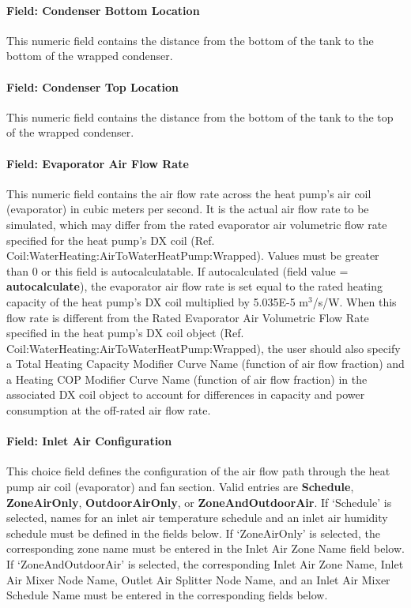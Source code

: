 \paragraph{Field: Condenser Bottom Location}\label{field-condenser-bottom-location}

This numeric field contains the distance from the bottom of the tank to the bottom of the wrapped condenser.

\paragraph{Field: Condenser Top Location}\label{field-condenser-top-location}

This numeric field contains the distance from the bottom of the tank to the top of the wrapped condenser.

\paragraph{Field: Evaporator Air Flow Rate}\label{field-evaporator-air-flow-rate-1}

This numeric field contains the air flow rate across the heat pump's air coil (evaporator) in cubic meters per second. It is the actual air flow rate to be simulated, which may differ from the rated evaporator air volumetric flow rate specified for the heat pump's DX coil (Ref. Coil:WaterHeating:AirToWaterHeatPump:Wrapped). Values must be greater than 0 or this field is autocalculatable. If autocalculated (field value = \textbf{autocalculate}), the evaporator air flow rate is set equal to the rated heating capacity of the heat pump's DX coil multiplied by 5.035E-5 m\(^{3}\)/s/W. When this flow rate is different from the Rated Evaporator Air Volumetric Flow Rate specified in the heat pump's DX coil object (Ref. Coil:WaterHeating:AirToWaterHeatPump:Wrapped), the user should also specify a Total Heating Capacity Modifier Curve Name (function of air flow fraction) and a Heating COP Modifier Curve Name (function of air flow fraction) in the associated DX coil object to account for differences in capacity and power consumption at the off-rated air flow rate.

\paragraph{Field: Inlet Air Configuration}\label{field-inlet-air-configuration-1}

This choice field defines the configuration of the air flow path through the heat pump air coil (evaporator) and fan section. Valid entries are \textbf{Schedule}, \textbf{ZoneAirOnly}, \textbf{OutdoorAirOnly}, or \textbf{ZoneAndOutdoorAir}. If `Schedule' is selected, names for an inlet air temperature schedule and an inlet air humidity schedule must be defined in the fields below. If `ZoneAirOnly' is selected, the corresponding zone name must be entered in the Inlet Air Zone Name field below. If `ZoneAndOutdoorAir' is selected, the corresponding Inlet Air Zone Name, Inlet Air Mixer Node Name, Outlet Air Splitter Node Name, and an Inlet Air Mixer Schedule Name must be entered in the corresponding fields below.

